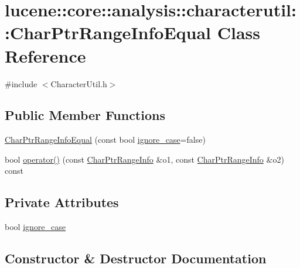 \hypertarget{classlucene_1_1core_1_1analysis_1_1characterutil_1_1CharPtrRangeInfoEqual}{}\section{lucene\+:\+:core\+:\+:analysis\+:\+:characterutil\+:\+:Char\+Ptr\+Range\+Info\+Equal Class Reference}
\label{classlucene_1_1core_1_1analysis_1_1characterutil_1_1CharPtrRangeInfoEqual}


{\ttfamily \#include $<$Character\+Util.\+h$>$}

\subsection*{Public Member Functions}
\begin{DoxyCompactItemize}
\item 
\mbox{\hyperlink{classlucene_1_1core_1_1analysis_1_1characterutil_1_1CharPtrRangeInfoEqual_a206c844633345c152f772b82d6802ce6}{Char\+Ptr\+Range\+Info\+Equal}} (const bool \mbox{\hyperlink{classlucene_1_1core_1_1analysis_1_1characterutil_1_1CharPtrRangeInfoEqual_a35cd49cc9665460db909c8c3ed635c27}{ignore\+\_\+case}}=false)
\item 
bool \mbox{\hyperlink{classlucene_1_1core_1_1analysis_1_1characterutil_1_1CharPtrRangeInfoEqual_a8cfbaa4e5fedbe76c6a1df2e7788ba75}{operator()}} (const \mbox{\hyperlink{classlucene_1_1core_1_1analysis_1_1characterutil_1_1CharPtrRangeInfo}{Char\+Ptr\+Range\+Info}} \&o1, const \mbox{\hyperlink{classlucene_1_1core_1_1analysis_1_1characterutil_1_1CharPtrRangeInfo}{Char\+Ptr\+Range\+Info}} \&o2) const
\end{DoxyCompactItemize}
\subsection*{Private Attributes}
\begin{DoxyCompactItemize}
\item 
bool \mbox{\hyperlink{classlucene_1_1core_1_1analysis_1_1characterutil_1_1CharPtrRangeInfoEqual_a35cd49cc9665460db909c8c3ed635c27}{ignore\+\_\+case}}
\end{DoxyCompactItemize}


\subsection{Constructor \& Destructor Documentation}
\mbox{\label{classlucene_1_1core_1_1analysis_1_1characterutil_1_1CharPtrRangeInfoEqual_a206c844633345c152f772b82d6802ce6}} 
